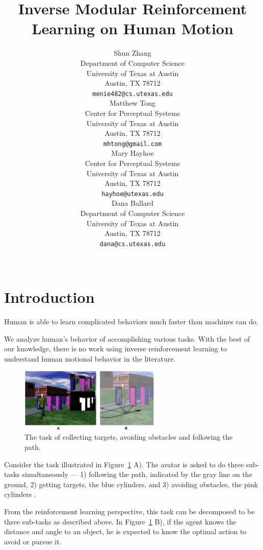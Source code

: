 \documentclass[11pt]{article} %
\title{Inverse Modular Reinforcement Learning on Human Motion}
\author{
Shun Zhang\\
Department of Computer Science\\
University of Texas at Austin\\
Austin, TX 78712 \\
\texttt{menie482@cs.utexas.edu} \\
\And
Matthew Tong \\
Center for Perceptual Systems\\
University of Texas at Austin\\
Austin, TX 78712 \\
\texttt{mhtong@gmail.com} \\
\AND
Mary Hayhoe \\
Center for Perceptual Systems\\
University of Texas at Austin\\
Austin, TX 78712 \\
\texttt{hayhoe@utexas.edu} \\
\And
Dana Ballard \\
Department of Computer Science\\
University of Texas at Austin\\
Austin, TX 78712 \\
\texttt{dana@cs.utexas.edu} \\
\\
}
\begin{document}
\maketitle

\begin{abstract}
\end{abstract}


\acknowledgements{}

\startmain %

\section{Introduction}

Human is able to learn complicated behaviors much faster than machines can do.

We analyze human's behavior of accomplishing various tasks. With the best of our
knowledge, there is no work using inverse reinforcement learning to understand
human motional behavior in the literature.

\begin{figure}[h!]
\centering
\includegraphics[width=0.6\textwidth]{avatar.png}
\caption{The task of collecting targets, avoiding obstacles and following the
path.}
\label{fig:avatar}
\end{figure}

Consider the task illustrated in Figure~\ref{fig:avatar} A). The avatar is asked to
do three sub-tasks simultaneously --- 1) following the path, indicated by the gray
line on the ground, 2) getting targets, the blue cylinders, and 3) avoiding
obstacles, the pink cylinders \cite{rothkopf2013modular}.

From the reinforcement learning perspective, this task can be decomposed to be
three sub-tasks as described above.  In Figure~\ref{fig:avatar} B), if the agent
knows the distance and angle to an object, he is expected to know the optimal
action to avoid or pursue it.
\end{document}
